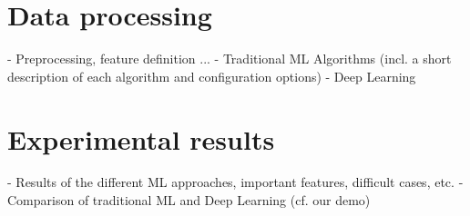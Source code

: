 \section{Data processing}
\label{sec:data_processing}
- Preprocessing, feature definition ...
- Traditional ML Algorithms (incl. a short description of each algorithm and configuration options)
- Deep Learning

\section{Experimental results}
- Results of the different ML approaches, important features, difficult cases, etc.
- Comparison of traditional ML and Deep Learning (cf. our demo)